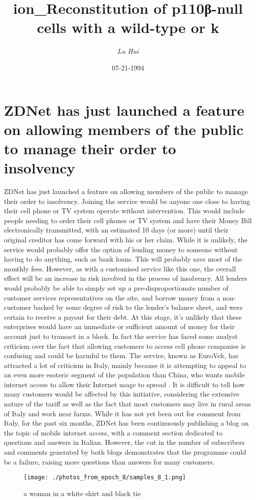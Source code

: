 \documentclass{article}%
\title{ion\_Reconstitution of p110β{-}null cells with a wild{-}type or k}%
\author{\textit{Lu Hui}}%
\date{07-21-1994}%
\begin{document}
%
\normalsize%
\maketitle%
\section{ZDNet has just launched a feature on allowing members of the public to manage their order to insolvency}%
\label{sec:ZDNethasjustlaunchedafeatureonallowingmembersofthepublictomanagetheirordertoinsolvency}%
ZDNet has just launched a feature on allowing members of the public to manage their order to insolvency. Joining the service would be anyone one close to having their cell phone or TV system operate without intervention. This would include people needing to order their cell phones or TV system and have their Money Bill electronically transmitted, with an estimated 10 days (or more) until their original creditor has come forward with his or her claim. While it is unlikely, the service would probably offer the option of lending money to someone without having to do anything, such as bank loans. This will probably save most of the monthly fees. However, as with a customised service like this one, the overall effect will be an increase in risk involved in the process of insolvency. All lenders would probably be able to simply set up a pre{-}disproportionate number of customer services representatives on the site, and borrow money from a non{-}customer backed by some degree of risk to the lender's balance sheet, and were certain to receive a payout for their debt. At this stage, it's unlikely that these enterprises would have an immediate or sufficient amount of money for their account just to transact in a block. In fact the service has faced some analyst criticism over the fact that allowing customers to access cell phone companies is confusing and could be harmful to them. The service, known as EuroVek, has attracted a lot of criticism in Italy, mainly because it is attempting to appeal to an even more esoteric segment of the population than China, who wants mobile internet access to allow their Internet usage to spread .\newline%
It is difficult to tell how many customers would be affected by this initiative, considering the extensive nature of the tariff as well as the fact that most customers may live in rural areas of Italy and work near farms. While it has not yet been out for comment from Italy, for the past six months, ZDNet has been continuously publishing a blog on the topic of mobile internet access, with a comment section dedicated to questions and answers in Italian. However, the cut in the number of subscribers and comments generated by both blogs demonstrates that the programme could be a failure, raising more questions than answers for many customers.\newline%

%


\begin{figure}[h!]%
\centering%
\texttt{[image: ./photos\_from\_epoch\_8/samples\_8\_1.png]}%
\caption{a woman in a white shirt and black tie}%
\end{figure}

%
\end{document}
